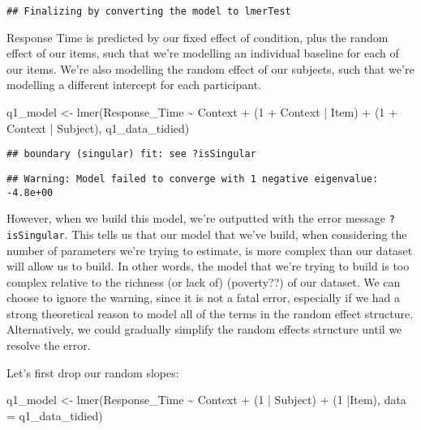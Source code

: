 \documentclass[
]{article}
\newenvironment{Shaded}{\begin{snugshade}}{\end{snugshade}}
\newcommand{\AttributeTok}[1]{\textcolor[rgb]{0.77,0.63,0.00}{#1}}
\newcommand{\DecValTok}[1]{\textcolor[rgb]{0.00,0.00,0.81}{#1}}
\newcommand{\FunctionTok}[1]{\textcolor[rgb]{0.00,0.00,0.00}{#1}}
\newcommand{\NormalTok}[1]{#1}
\newcommand{\OtherTok}[1]{\textcolor[rgb]{0.56,0.35,0.01}{#1}}
\newcommand{\SpecialCharTok}[1]{\textcolor[rgb]{0.00,0.00,0.00}{#1}}
\begin{document}
\begin{verbatim}
## Finalizing by converting the model to lmerTest
\end{verbatim}

Response Time is predicted by our fixed effect of condition, plus the
random effect of our items, such that we're modelling an individual
baseline for each of our items. We're also modelling the random effect
of our subjects, such that we're modelling a different intercept for
each participant.

\begin{Shaded}
\begin{Highlighting}[]
\NormalTok{q1\_model }\OtherTok{\textless{}{-}} \FunctionTok{lmer}\NormalTok{(Response\_Time }\SpecialCharTok{\textasciitilde{}}\NormalTok{ Context }\SpecialCharTok{+} 
\NormalTok{                    (}\DecValTok{1} \SpecialCharTok{+}\NormalTok{ Context }\SpecialCharTok{|}\NormalTok{ Item) }\SpecialCharTok{+}
\NormalTok{                    (}\DecValTok{1} \SpecialCharTok{+}\NormalTok{ Context }\SpecialCharTok{|}\NormalTok{ Subject),}
\NormalTok{                  q1\_data\_tidied)}
\end{Highlighting}
\end{Shaded}

\begin{verbatim}
## boundary (singular) fit: see ?isSingular
\end{verbatim}

\begin{verbatim}
## Warning: Model failed to converge with 1 negative eigenvalue: -4.8e+00
\end{verbatim}

However, when we build this model, we're outputted with the error
message \texttt{?isSingular}. This tells us that our model that we've
build, when considering the number of parameters we're trying to
estimate, is more complex than our dataset will allow us to build. In
other words, the model that we're trying to build is too complex
relative to the richness (or lack of) (poverty??) of our dataset. We can
choose to ignore the warning, since it is not a fatal error, especially
if we had a strong theoretical reason to model all of the terms in the
random effect structure. Alternatively, we could gradually simplify the
random effects structure until we resolve the error.

Let's first drop our random slopes:

\begin{Shaded}
\begin{Highlighting}[]
\NormalTok{q1\_model }\OtherTok{\textless{}{-}} \FunctionTok{lmer}\NormalTok{(Response\_Time }\SpecialCharTok{\textasciitilde{}}\NormalTok{ Context }\SpecialCharTok{+}
\NormalTok{                   (}\DecValTok{1} \SpecialCharTok{|}\NormalTok{ Subject) }\SpecialCharTok{+}
\NormalTok{                   (}\DecValTok{1} \SpecialCharTok{|}\NormalTok{Item),}
                 \AttributeTok{data =}\NormalTok{ q1\_data\_tidied)}
\end{Highlighting}
\end{Shaded}
\end{document}
